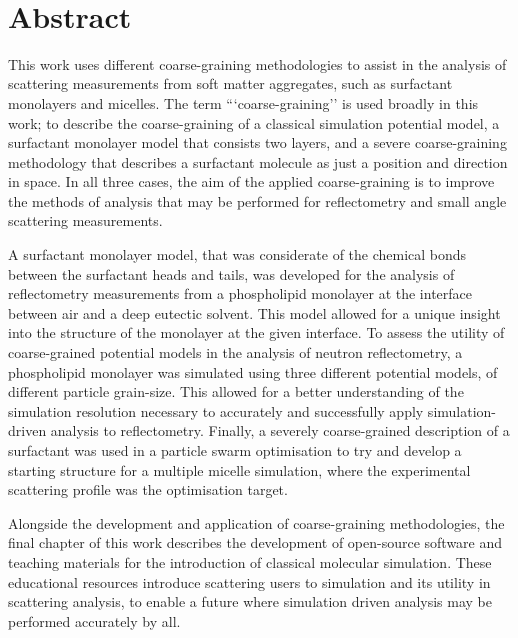 \documentclass[twoside,symmetric,nobib]{./arm-thesis}
\newcommand{\blankpage}{\newpage\hbox{}\thispagestyle{empty}\newpage}
\begin{document}
\blankpage

\begin{fullwidth}
\thispagestyle{empty}
\setlength{\parindent}{0pt}
\setlength{\parskip}{\baselineskip}
~\vfill
\chapter*{Abstract}
This work uses different coarse-graining methodologies to assist in the analysis of scattering measurements from soft matter aggregates, such as surfactant monolayers and micelles.
The term ```coarse-graining'' is used broadly in this work; to describe the coarse-graining of a classical simulation potential model, a surfactant monolayer model that consists two layers, and a severe coarse-graining methodology that describes a surfactant molecule as just a position and direction in space.
In all three cases, the aim of the applied coarse-graining is to improve the methods of analysis that may be performed for reflectometry and small angle scattering measurements.

A surfactant monolayer model, that was considerate of the chemical bonds between the surfactant heads and tails, was developed for the analysis of reflectometry measurements from a phospholipid monolayer at the interface between air and a deep eutectic solvent.
This model allowed for a unique insight into the structure of the monolayer at the given interface.
To assess the utility of coarse-grained potential models in the analysis of neutron reflectometry, a phospholipid monolayer was simulated using three different potential models, of different particle grain-size.
This allowed for a better understanding of the simulation resolution necessary to accurately and successfully apply simulation-driven analysis to reflectometry.
Finally, a severely coarse-grained description of a surfactant was used in a particle swarm optimisation to try and develop a starting structure for a multiple micelle simulation, where the experimental scattering profile was the optimisation target.

Alongside the development and application of coarse-graining methodologies, the final chapter of this work describes the development of open-source software and teaching materials for the introduction of classical molecular simulation.
These educational resources introduce scattering users to simulation and its utility in scattering analysis, to enable a future where simulation driven analysis may be performed accurately by all.
~\vfill
\end{fullwidth}
\end{document}
